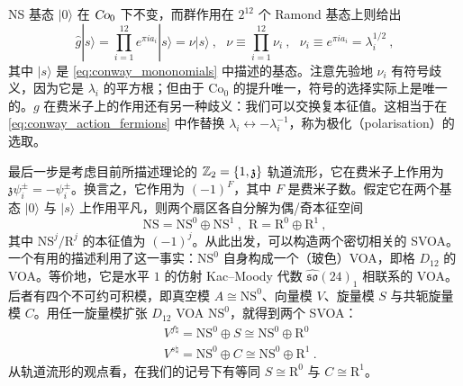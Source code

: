 
NS 基态 $|0\rangle$ 在 $\operatorname{\textsl{Co}}_0$ 下不变，而群作用在 $2^{12}$ 个 Ramond 基态上则给出
\begin{equation}
\hat{g}|s\rangle=\prod_{i=1}^{12}e^{\pi i a_i}|s\rangle=\nu|s\rangle~,~~~\nu\equiv\prod_{i=1}^{12}\nu_i~,~~~\nu_i\equiv e^{\pi ia_i}=\lambda_i^{1/2}~,
\end{equation}
其中 $|s\rangle$ 是 \eqref{eq:conway_mononomials} 中描述的基态。注意先验地 $\nu_i$ 有符号歧义，因为它是 $\lambda_i$ 的平方根；但由于 $\text{Co}_0$ 的提升唯一，符号的选择实际上是唯一的。$g$ 在费米子上的作用还有另一种歧义：我们可以交换复本征值。这相当于在 \eqref{eq:conway_action_fermions} 中作替换 $\lambda_i\leftrightarrow-\lambda_i^{-1}$，称为极化（polarisation）的选取。


最后一步是考虑目前所描述理论的 $\mathbb{Z}_2=\lbrace1,\mathfrak{z}\rbrace$ 轨道流形，它在费米子上作用为 $\mathfrak{z}\psi^\pm_i=-\psi^\pm_i$。换言之，它作用为 $(-1)^F$，其中 $F$ 是费米子数。假定它在两个基态 $|0\rangle$ 与 $|s\rangle$ 上作用平凡\cite{DuncanJohnf.r.2015TMMF}，则两个扇区各自分解为偶/奇本征空间
\begin{equation}
\text{NS}=\text{NS}^0\oplus\text{NS}^1~,~~\text{R}=\text{R}^0\oplus\text{R}^1~,
\end{equation}
其中 $\text{NS}^j/\text{R}^j$ 的本征值为 $(-1)^j$。从此出发，可以构造两个密切相关的 SVOA。一个有用的描述利用了这一事实：$\text{NS}^0$ 自身构成一个（玻色）VOA，即格 $D_{12}$ 的 VOA。等价地，它是水平 $1$ 的仿射 Kac–Moody 代数 $\widehat{\mathfrak{so}}(24)_1$ 相联系的 VOA。后者有四个不可约可积模，即真空模 $A\cong\text{NS}^0$、向量模 $V$、旋量模 $S$ 与共轭旋量模 $C$。用任一旋量模扩张 $D_{12}$ VOA $\text{NS}^0$，就得到两个 SVOA：
\begin{equation}
\label{eq:Vf,Vs}
\begin{split}
&V^{f\natural}=\text{NS}^0\oplus S\cong\text{NS}^0\oplus \text{R}^0 \\
&V^{s\natural}=\text{NS}^0\oplus C\cong\text{NS}^0\oplus \text{R}^1~. 
\end{split}
\end{equation}
从轨道流形的观点看，在我们的记号下有等同 $S\cong\text{R}^0$ 与 $C\cong\text{R}^1$。


